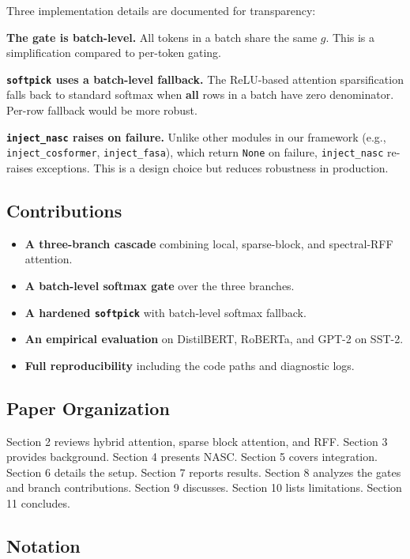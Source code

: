 Three implementation details are documented for transparency:

\textbf{The gate is batch-level.} All tokens in a batch share the same $g$. 
This is a simplification compared to per-token gating.

\textbf{\texttt{softpick} uses a batch-level fallback.} The ReLU-based attention 
sparsification falls back to standard softmax when \textbf{all} rows in a 
batch have zero denominator. Per-row fallback would be more robust.

\textbf{\texttt{inject\_nasc} raises on failure.} Unlike other modules in our framework 
(e.g., \texttt{inject\_cosformer}, \texttt{inject\_fasa}), which return \texttt{None} on failure, 
\texttt{inject\_nasc} re-raises exceptions. This is a design choice but reduces 
robustness in production.

\subsection{Contributions}

\begin{itemize}
\item \textbf{A three-branch cascade} combining local, sparse-block, and spectral-RFF
  attention.
\item \textbf{A batch-level softmax gate} over the three branches.
\item \textbf{A hardened \texttt{softpick}} with batch-level softmax fallback.
\item \textbf{An empirical evaluation} on DistilBERT, RoBERTa, and GPT-2 on SST-2.
\item \textbf{Full reproducibility} including the code paths and diagnostic logs.

\end{itemize}
\subsection{Paper Organization}

Section 2 reviews hybrid attention, sparse block attention, and RFF. 
Section 3 provides background. Section 4 presents NASC. Section 5 covers 
integration. Section 6 details the setup. Section 7 reports results. 
Section 8 analyzes the gates and branch contributions. Section 9 discusses. 
Section 10 lists limitations. Section 11 concludes.



\subsection{Notation}

